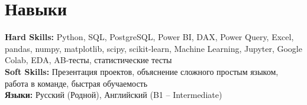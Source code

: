 \documentclass[letterpaper,11pt]{article}
\begin{document}
\section{Навыки}
 \begin{itemize}[leftmargin=0.15in, label={}]
    \small{\item{
     \textbf{Hard Skills:} Python, SQL, PostgreSQL, Power BI, DAX, Power Query, Excel, pandas, numpy, matplotlib, scipy, scikit-learn, Machine Learning, Jupyter, Google Colab, EDA, AB-тесты, статистические тесты \\
     \textbf{Soft Skills:} Презентация проектов, объяснение сложного простым языком, работа в команде, быстрая обучаемость \\
     \textbf{Языки:} Русский (Родной), Английский (B1 -- Intermediate)
    }}
 \end{itemize}

\end{document}
